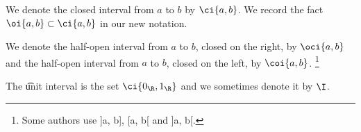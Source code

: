 We denote the closed interval from $a$ to $b$ by $\ci{a, b}$.
We record the fact $\oi{a, b} \subset \ci{a, b}$ in our new notation.

We denote the half-open interval from $a$ to $b$, closed on the right, by $\oci{a, b}$ and the half-open interval from $a$ to $b$, closed on the left, by $\coi{a, b}$.
  \ifhmode\unskip\fi\footnote{
Some authors use ]a, b], [a, b[ and ]a, b[.
  }

The \t{unit interval} is the set $\ci{0_{\R }, 1_{\R }}$ and we sometimes denote it by $\I$.
